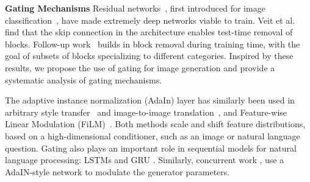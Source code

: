 


\vspace{2mm} \noindent \textbf{Gating Mechanisms}
Residual networks~\cite{he2016deep}, first introduced for image classification~\cite{krizhevsky2012imagenet}, have made extremely deep networks viable to train. Veit et al.~\cite{veit2016residual} find that the skip connection in the architecture enables test-time removal of blocks. Follow-up work~\cite{veit2018adaptive} builds in block removal during training time, with the goal of subsets of blocks specializing to different categories. Inspired by these results, we propose the use of gating for image generation and provide a systematic analysis of gating mechanisms.

The adaptive instance normalization (AdaIn) layer has similarly been used in arbitrary style transfer~\cite{huang2017arbitrary} and image-to-image translation~\cite{huang2018multimodal}, and Feature-wise Linear Modulation (FiLM)~\cite{perez2017film}. Both methods scale and shift feature distributions, based on a high-dimensional conditioner, such as an image or natural language question. Gating also plays an important role in sequential models for natural language processing: LSTMs \cite{hochreiter1997long} and GRU \cite{cho2014learning}. Similarly, concurrent work \cite{karras2018style}, \cite{park2019semantic} use a AdaIN-style network to modulate the generator parameters.

